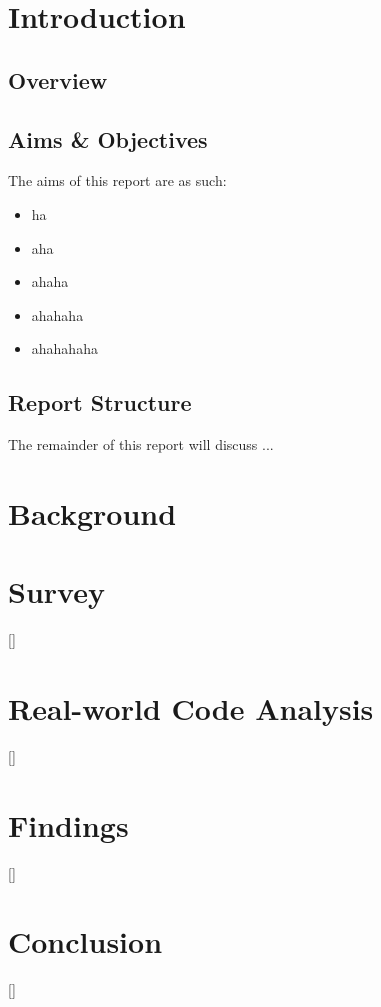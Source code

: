 \documentclass{article}
\begin{document}

\section{Introduction}
    \subsection{Overview}
    \subsection{Aims \& Objectives}
        The aims of this report are as such:
        \begin{itemize}
            \item ha
            \item aha
            \item ahaha
            \item ahahaha
            \item ahahahaha
        \end{itemize}
    \subsection{Report Structure}
        The remainder of this report will discuss ...
\newpage
\section{Background}
\label{sec:background)}
\section{Survey}
        []
\section{Real-world Code Analysis}
    []
\section{Findings}
    []
\section{Conclusion}
\label{sec:conclusion}
    []
\end{document}
